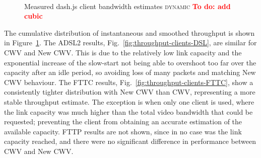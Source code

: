 \documentclass[10pt, acmlarge]{acmart}
\newcommand{\todo}[1]{\textbf{\textcolor{red}{To do: #1}}}
\begin{document}
\begin{figure}[t!]
  \centering
  \\
  \caption{Measured dash.js client bandwidth estimates \textsc{dynamic} \todo{add cubic}}
  \label{fig:throughput-clients}
\end{figure}

The cumulative distribution of instantaneous and smoothed throughput is shown in 
Figure~\ref{fig:throughput-clients}. 
%
The ADSL2 results, Fig.~\ref{fig:throughput-clients-DSL}, are similar for CWV and New CWV.
This is due to the relatively low link capacity and the exponential increase of the 
slow-start not being able to overshoot too far over the capacity after an idle period,
so avoiding loss of many packets and matching New CWV behaviour.
The FTTC results, Fig.~\ref{fig:throughput-clients-FTTC}, show a consistently tighter 
distribution with New CWV than CWV, representing a more stable throughput estimate. 
The exception is when only one client is used, where the link capacity was much 
higher than the total video bandwidth that could be requested; preventing the 
client from obtaining an accurate estimation of the available capacity.
%
FTTP results are not shown, since in no case was the link capacity reached,
 and there were no significant difference in performance between CWV and New CWV.
\end{document}
